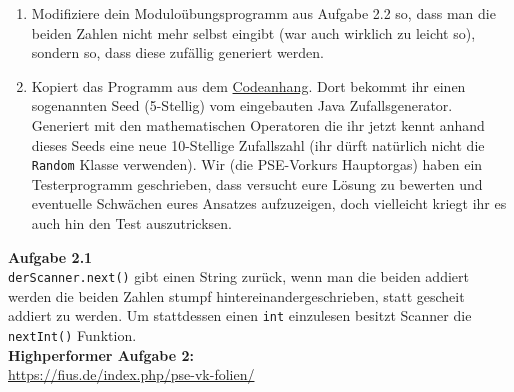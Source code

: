 \documentclass{../../sheet}
\begin{document}
\begin{enumerate}
    \item Modifiziere dein Moduloübungsprogramm aus Aufgabe 2.2 so, dass man die beiden Zahlen nicht mehr selbst eingibt (war auch wirklich zu leicht so), sondern so, dass diese zufällig generiert werden.
    \item Kopiert das Programm aus dem \hyperlink{Aufgabe_2.2}{Codeanhang}. Dort bekommt ihr einen sogenannten Seed (5-Stellig) vom eingebauten Java Zufallsgenerator. Generiert mit den mathematischen Operatoren die ihr jetzt kennt anhand dieses Seeds eine neue 10-Stellige Zufallszahl (ihr dürft natürlich nicht die \texttt{Random} Klasse verwenden). Wir (die PSE-Vorkurs Hauptorgas) haben ein Testerprogramm geschrieben, dass versucht eure Lösung zu bewerten und eventuelle Schwächen eures Ansatzes aufzuzeigen, doch vielleicht kriegt ihr es auch hin den Test auszutricksen.
\end{enumerate}

\newpage
{}
\hypertarget{Aufgabe_2.1}{}
\textbf{Aufgabe 2.1}\\
\texttt{derScanner.next()} gibt einen String zurück, wenn man die beiden addiert werden die beiden Zahlen stumpf hintereinandergeschrieben, statt gescheit addiert zu werden. Um stattdessen einen \texttt{int} einzulesen besitzt Scanner die \texttt{nextInt()} Funktion.\\
\textbf{Highperformer Aufgabe 2:}
\hypertarget{Aufgabe_2.2}{}
\\\url{https://fius.de/index.php/pse-vk-folien/}
\end{document}
